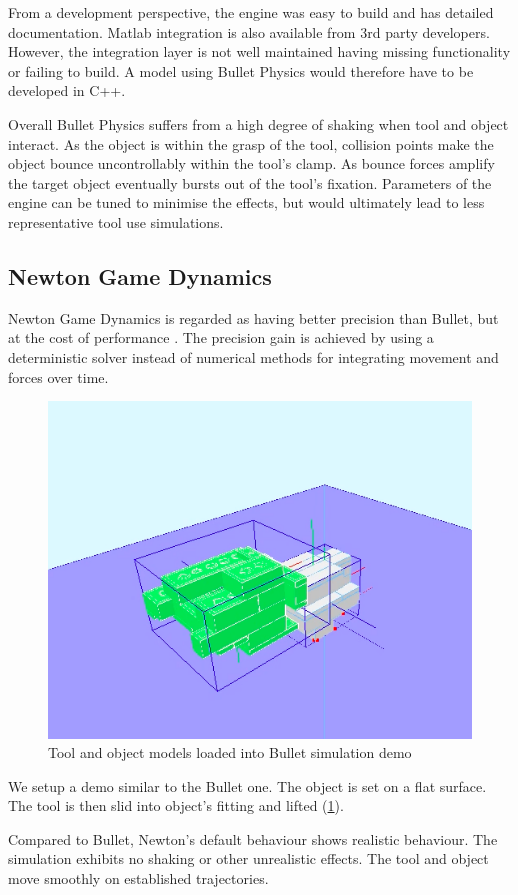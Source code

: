 \documentclass[11]{article}
\begin{document}
From a development perspective, the engine was easy to build and has detailed documentation.
Matlab integration is also available from 3rd party developers. 
However, the integration layer is not well maintained having missing functionality or failing to build.
A model using Bullet Physics would therefore have to be developed in C++. 

Overall Bullet Physics suffers from a high degree of shaking when tool and object interact. 
As the object is within the grasp of the tool, collision points make the object bounce uncontrollably within the tool's clamp. As bounce forces amplify the target object eventually bursts out of the tool's fixation.  
Parameters of the engine can be tuned to minimise the effects, but would ultimately lead to less representative tool use simulations. 

\subsection{Newton Game Dynamics}
Newton Game Dynamics is regarded as having better precision than Bullet, but at the cost of performance \cite{hummel2012}. 
The precision gain is achieved by using a deterministic solver instead of numerical methods for integrating movement and forces over time. 

\begin{figure}[h]
  \centering
  \includegraphics[width=.5\textwidth]{./figures/newton_demo.png}
  \caption{Tool and object models loaded into Bullet simulation demo}
  \label{fig:newton_demo}
\end{figure}      

We setup a demo similar to the Bullet one.
The object is set on a flat surface. 
The tool is then slid into object's fitting and lifted (\ref{fig:newton_demo}). 

Compared to Bullet, Newton's default behaviour shows realistic behaviour. 
The simulation exhibits no shaking or other unrealistic effects.
The tool and object move smoothly on established trajectories. 
\end{document}
